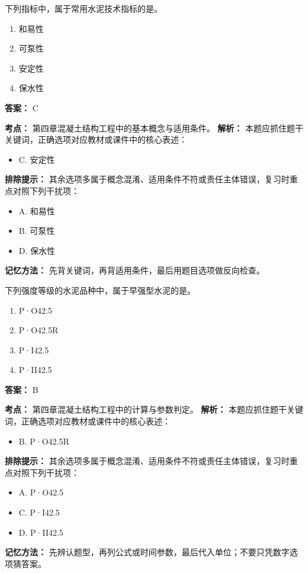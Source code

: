 \documentclass[UTF8,fontset=fandol,11pt]{ctexart}
\begin{document}
\begin{quizbox}[title={第 34 题}]
下列指标中，属于常用水泥技术指标的是。\\
\begin{enumerate}[label=\Alph*.]
\item 和易性
\item 可泵性
\item 安定性
\item 保水性
\end{enumerate}
\textbf{答案：} C
\vspace{0.25em}
\begin{answerbox}[title={考点解析}]
\textbf{考点：} 第四章混凝土结构工程中的基本概念与适用条件。
\textbf{解析：} 本题应抓住题干关键词，正确选项对应教材或课件中的核心表述：
\begin{itemize}
\item C. 安定性
\end{itemize}
\textbf{排除提示：} 其余选项多属于概念混淆、适用条件不符或责任主体错误，复习时重点对照下列干扰项：
\begin{itemize}
\item A. 和易性
\item B. 可泵性
\item D. 保水性
\end{itemize}
\textbf{记忆方法：} 先背关键词，再背适用条件，最后用题目选项做反向检查。
\end{answerbox}
\end{quizbox}

\vspace{0.2em}

\begin{quizbox}[title={第 35 题}]
下列强度等级的水泥品种中，属于早强型水泥的是。\\
\begin{enumerate}[label=\Alph*.]
\item P·O42.5
\item P·O42.5R
\item P·I42.5
\item P·II42.5
\end{enumerate}
\textbf{答案：} B
\vspace{0.25em}
\begin{answerbox}[title={考点解析}]
\textbf{考点：} 第四章混凝土结构工程中的计算与参数判定。
\textbf{解析：} 本题应抓住题干关键词，正确选项对应教材或课件中的核心表述：
\begin{itemize}
\item B. P·O42.5R
\end{itemize}
\textbf{排除提示：} 其余选项多属于概念混淆、适用条件不符或责任主体错误，复习时重点对照下列干扰项：
\begin{itemize}
\item A. P·O42.5
\item C. P·I42.5
\item D. P·II42.5
\end{itemize}
\textbf{记忆方法：} 先辨认题型，再列公式或时间参数，最后代入单位；不要只凭数字选项猜答案。
\end{answerbox}
\end{quizbox}
\end{document}
